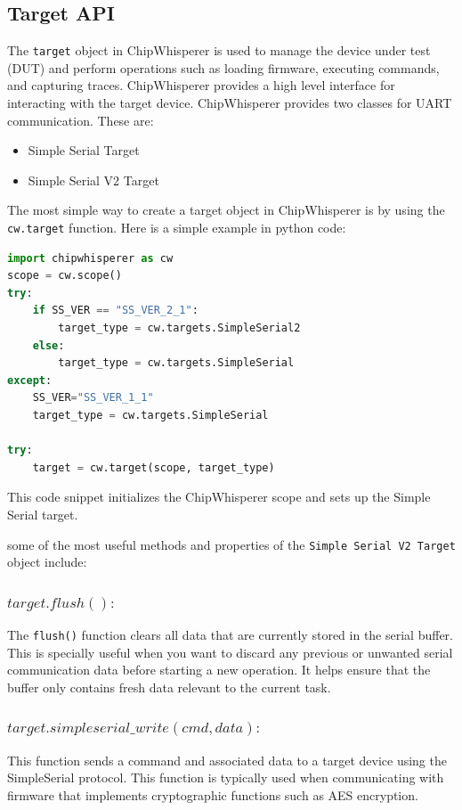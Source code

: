 \subsection{Target API}
The \texttt{target} object in ChipWhisperer is used to manage the device under test (DUT) and perform operations such as loading firmware, executing commands, and capturing traces. ChipWhisperer provides a high level interface for interacting with the target device.
ChipWhisperer provides two classes for UART communication. These are:

\begin{itemize}
    \item Simple Serial Target
    \item Simple Serial V2 Target
\end{itemize}

The most simple way to create a target object in ChipWhisperer is by using the \texttt{cw.target} function. Here is a simple example in python code:

\begin{lstlisting}[language=Python]
import chipwhisperer as cw
scope = cw.scope()
try:
    if SS_VER == "SS_VER_2_1":
        target_type = cw.targets.SimpleSerial2
    else:
        target_type = cw.targets.SimpleSerial
except:
    SS_VER="SS_VER_1_1"
    target_type = cw.targets.SimpleSerial

try:
    target = cw.target(scope, target_type)
\end{lstlisting}

This code snippet initializes the ChipWhisperer scope and sets up the Simple Serial target.

some of the most useful methods and properties of the \texttt{Simple Serial V2 Target} object include:
\subsubsection{$target.flush() :$}
The \texttt{flush()} function clears all data that are currently stored in the serial buffer. This is specially useful when you want to discard any previous or unwanted serial communication data before starting a new operation. It helps ensure that the buffer only contains fresh data relevant to the current task.

\subsubsection{$target.simpleserial\_write(cmd, data) :$}
This function sends a command and associated data to a target device using the SimpleSerial protocol. This function is typically used when communicating with firmware that implements cryptographic functions such as AES encryption. 


